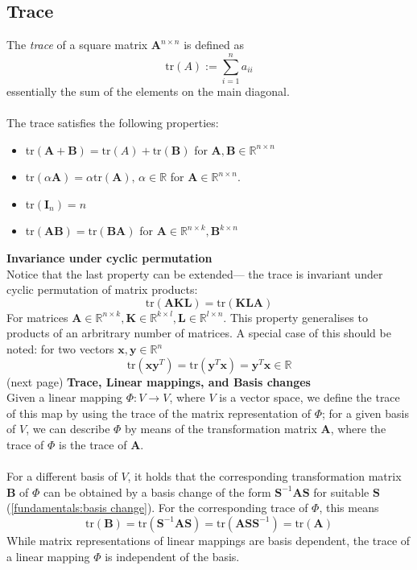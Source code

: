 \documentclass{report}
\begin{document}
\subsection{Trace} %
The \textit{trace} of a square matrix $\bm{A}^{n\times n}$ is 
defined as 
\begin{equation*}
\text{tr}(A):=\sum^n_{i=1}a_{ii}
\end{equation*}
essentially the sum of the elements on the main diagonal.
\\
\vspace{1mm}\\
The trace satisfies the following properties:
\begin{itemize}
\item tr$(\bm{A+B})=\text{tr}(A)+\text{tr}(\bm{B})$ for
$\bm{A},\bm{B}\in\mathbb{R}^{n\times n}$
\item tr$(\alpha\bm{A})=\alpha\text{tr}(\bm{A}),\,\alpha\in\mathbb{R}$ for $\bm{A}\in\mathbb{R}^{n\times n}$.
\item tr$(\bm{I}_n)=n$
\item tr$(\bm{AB})=\text{tr}(\bm{BA})$ for $\bm{A}\in\mathbb{R}^{n\times k},\bm{B}^{k\times n}$
\end{itemize}
\textbf{Invariance under cyclic permutation}\\
Notice that the last property can be extended---
the trace is invariant under cyclic permutation of matrix products:
\begin{equation*}
\text{tr}(\bm{AKL})=\text{tr}(\bm{KLA})
\end{equation*}
For matrices $\bm{A}\in\mathbb{R}^{n\times k},\bm{K}\in\mathbb{R}^{k\times l},\bm{L}\in\mathbb{R}^{l\times n}$.
This property generalises to products of an arbritrary number of matrices. 
A special case of this should be noted: for two vectors 
$\bm{x},\bm{y}\in\mathbb{R}^n$
\begin{equation*}
\text{tr}(\bm{xy}^T)=\text{tr}(\bm{y}^T\bm{x})=\bm{y}^T\bm{x}\in\mathbb{R}
\end{equation*}
(next page)
\newpage
\noindent\textbf{Trace, Linear mappings, and Basis changes}\\
Given a linear mapping $\Phi:V\to V$, where $V$ is a vector space, we define the trace of this map
by using the trace of the matrix representation of $\Phi$;
for a given basis of $V$, we can describe $\Phi$ by means
of the transformation matrix $\bm{A}$, where the trace of $\Phi$ is the trace of $\bm{A}$.\\
\vspace{1mm}\\
For a different basis of $V$, it holds that the corresponding transformation matrix $\bm{B}$ of $\Phi$ can be
obtained by a basis change of the form $\bm{S}^{-1}\bm{AS}$ for suitable $\bm{S}$ (\ref{fundamentals:basis change}).
For the corresponding trace of $\Phi$, this means
\begin{equation*}
\text{tr}(\bm{B})=\text{tr}(\bm{S}^{-1}\bm{AS})=
\text{tr}(\bm{AS}\bm{S}^{-1})=\text{tr}(\bm{A})
\end{equation*}
While matrix representations of linear mappings are basis dependent, the trace of a linear mapping $\Phi$ 
is independent of the basis.
\newpage
\end{document}
